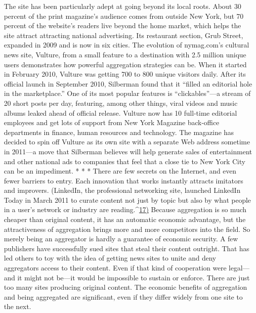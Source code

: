 The site has been particularly adept at going beyond its local roots. About 30
percent of the print magazine’s audience comes from outside New York, but 70
percent of the website’s readers live beyond the home market, which helps the
site attract attracting national advertising. Its restaurant section, Grub Street, expanded
in 2009 and is now in six cities.
The evolution of nymag.com’s cultural news site, Vulture, from a small feature
to a destination with 2.5 million unique users demonstrates how powerful aggregation
strategies can be. When it started in February 2010, Vulture was getting
700 to 800 unique visitors daily. After its official launch in September 2010,
Silberman found that it ``filled an editorial hole in the marketplace.'' One of its
most popular features is ``clickables''—a stream of 20 short posts per day, featuring,
among other things, viral videos and music albums leaked ahead of official
release. Vulture now has 10 full-time editorial employees and get lots of support
from New York Magazine back-office departments in finance, human resources
and technology. The magazine has decided to spin off Vulture as its own site with
a separate Web address sometime in 2011—a move that Silberman believes will
help generate sales of entertainment and other national ads to companies that feel
that a close tie to New York City can be an impediment.
* * *
There are few secrets on the Internet, and even fewer barriers to entry. Each
innovation that works instantly attracts imitators and improvers. (LinkedIn, the
professional networking site, launched LinkedIn Today in March 2011 to curate
content not just by topic but also by what people in a user’s network or industry
are reading.^{\href{#endnotes-ch6}{17)}} Because aggregation is so much cheaper than original content,
it has an automatic economic advantage, but the attractiveness of aggregation
brings more and more competitors into the field. So merely being an aggregator
is hardly a guarantee of economic security.
A few publishers have successfully sued sites that steal their content outright.
That has led others to toy with the idea of getting news sites to unite and deny
aggregators access to their content. Even if that kind of cooperation were legal—
and it might not be—it would be impossible to sustain or enforce. There are just
too many sites producing original content. The economic benefits of aggregation
and being aggregated are significant, even if they differ widely from one site to
the next.

